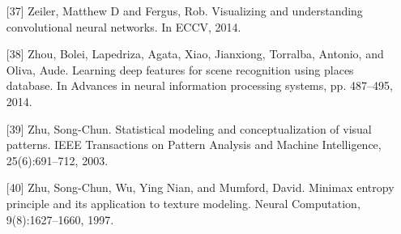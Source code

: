 \begin{itemize}
\item [{[}37{]}] Zeiler, Matthew D and Fergus, Rob. Visualizing and understanding convolutional neural networks. In ECCV, 2014.
\item [{[}38{]}] Zhou, Bolei, Lapedriza, Agata, Xiao, Jianxiong, Torralba, Antonio, and Oliva, Aude. Learning deep features for scene recognition using places database. In Advances in neural information processing systems, pp. 487–495, 2014.
\item [{[}39{]}] Zhu, Song-Chun. Statistical modeling and conceptualization of visual patterns. IEEE Transactions on Pattern Analysis and Machine Intelligence, 25(6):691–712, 2003.
\item [{[}40{]}] Zhu, Song-Chun, Wu, Ying Nian, and Mumford, David. Minimax entropy principle and its application to texture modeling. Neural Computation, 9(8):1627–1660, 1997.
\end{itemize}

